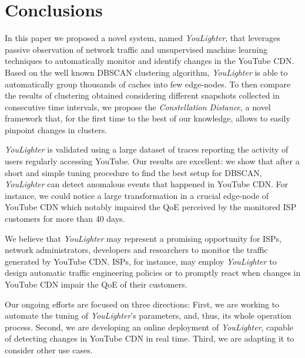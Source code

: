 \documentclass{acm_proc_article-sp}
\newcommand{\tool}{\textit{YouLighter}\xspace}
\newcommand{\distance}{\textit{Constellation Distance}\xspace}
\newcommand{\node}{{edge-node}\xspace}
\newcommand{\nodes}{{edge-nodes}\xspace}
\begin{document}
\section{Conclusions}
\label{sec:conclu}

In this paper we proposed a novel system, named \tool, that leverages passive observation of network traffic and unsupervised machine learning techniques to automatically monitor and identify changes in the YouTube CDN. Based on the well known DBSCAN clustering algorithm, \tool is able to automatically group thousands of caches into few \nodes. 
To then compare the results of clustering obtained considering different snapshots collected in consecutive time intervals, we propose the \distance, a novel framework that, for the first time to the best of our knowledge, allows to easily pinpoint changes in clusters.

\tool is validated using a large dataset of traces reporting the activity of users regularly accessing YouTube. Our results are excellent: we show that after a short and simple tuning procedure to find the best setup for DBSCAN, \tool can detect anomalous events that happened in YouTube CDN. For instance, we could notice a large transformation in a crucial \node of YouTube CDN which notably impaired the QoE perceived by the monitored ISP customers for more than 40 days. 

We believe that \tool may represent a promising opportunity for ISPs, network administrators, developers and researchers to monitor the traffic generated by YouTube CDN. ISPs, for instance, may employ \tool to design automatic traffic engineering policies or to promptly react when changes in YouTube CDN impair the QoE of their customers.

Our ongoing efforts are focused on three directions: First, we are working to automate the tuning of \tool's parameters, and, thus, its whole operation process. Second, we are developing an online deployment of \tool, capable of detecting changes in YouTube CDN in real time. Third, we are adapting it to consider other use cases.
\end{document}
